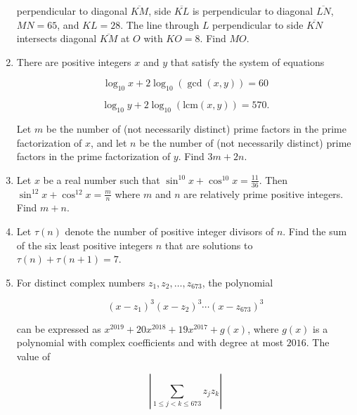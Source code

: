 \documentclass{article}
\begin{document}
\begin{enumerate}[label=\arabic*., itemsep=0.5em]
perpendicular to diagonal $\overline{KM}$, side $\overline{KL}$ is perpendicular to diagonal $\overline{LN}$, $MN = 65$, and $KL = 28$. The line through $L$ perpendicular to side $\overline{KN}$ intersects diagonal $\overline{KM}$ at $O$ with $KO = 8$. Find $MO$.\par \vspace{0.5em}\item There are positive integers $x$ and $y$ that satisfy the system of equations

\begin{equation*}
\log_{10} x + 2 \log_{10} (\gcd(x,y)) = 60
\end{equation*}
 
\begin{equation*}
\log_{10} y + 2 \log_{10} (\text{lcm}(x,y)) = 570.
\end{equation*}

Let $m$ be the number of (not necessarily distinct) prime factors in the prime factorization of $x$, and let $n$ be the number of (not necessarily distinct) prime factors in the prime factorization of $y$. Find $3m+2n$.\par \vspace{0.5em}\item Let $x$ be a real number such that $\sin^{10}x+\cos^{10} x = \tfrac{11}{36}$. Then $\sin^{12}x+\cos^{12} x = \tfrac{m}{n}$ where $m$ and $n$ are relatively prime positive integers. Find $m+n$.\par \vspace{0.5em}\item Let $\tau(n)$ denote the number of positive integer divisors of $n$. Find the sum of the six least positive integers $n$ that are solutions to $\tau (n) + \tau (n+1) = 7$.\par \vspace{0.5em}\item For distinct complex numbers $z_1,z_2,\dots,z_{673}$, the polynomial 

\begin{equation*}
(x-z_1)^3(x-z_2)^3 \cdots (x-z_{673})^3
\end{equation*}

can be expressed as $x^{2019} + 20x^{2018} + 19x^{2017}+g(x)$, where $g(x)$ is a polynomial with complex coefficients and with degree at most $2016$. The value of 

\begin{equation*}
\left| \sum_{1 \le j <k \le 673} z_jz_k \right|
\end{equation*}


\end{enumerate}
\end{document}
